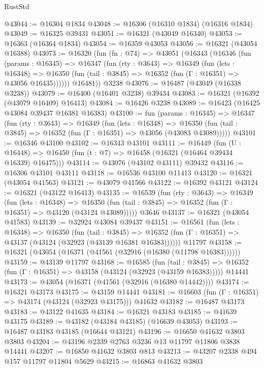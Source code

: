 \begin{lexlean}{RustStd}
\begin{coremodule}
@43044 := @16304 @1834
@43048 := @16306 (@16310 @1834) (@16316 @1834)
@43049 := @16325 @39431
@43051 := @16321 (@43049 @16340)
@43053 := @16363 (@16364 @1834)
@43054 := @16359 @43053
@43056 := @16321 (@43054 @16388)
@43073 := @16320
    (fun (fn : @74) =>
    @43051
      (@16343
        (@16346
          (fun (params : @16345) =>
          @16347
            (fun (rty : @3643) =>
            @16349
              (fun (lets : @16348) =>
              @16350 (fun (tail : @3845) => @16352 (fun (Γ : @16351) => @43056 @16435))))))
        @16481))
    @3238
@43076 := @16487 (@43049 (@16338 @3238))
@43079 := @16400 (@16401 @3238) @39434
@43083 := @16321 (@16392 (@43079 @16409) @16413)
@43084 := @16426 @3238
@43089 := @16423 (@16425 @43084 @39437 @16381 @16383)
@43100 := fun (params : @16345) =>
  @16347
    (fun (rty : @3643) =>
    @16349
      (fun (lets : @16348) =>
      @16350 (fun (tail : @3845) => @16352 (fun (Γ : @16351) => @43056 (@43083 @43089)))))
@43101 := @16346 @43100
@43102 := @16343 @43101
@43111 := @16449
    (fun (U : @16448) => @16450 (fun (t : @7) => @16458 (@16321 (@16464 @39434 @16339) @16475)))
@43114 := @43076 (@43102 @43111) @39432
@43116 := @16306 @43101 @43111
@43118 := @16536 @43100 @11413
@43120 := @16321 (@43054 @41563)
@43121 := @43079 @41566
@43122 := @16392 @43121
@43124 := @16321 (@43122 @16413)
@43135 := @16539
    (fun (rty : @3643) =>
    @16349
      (fun (lets : @16348) =>
      @16350 (fun (tail : @3845) => @16352 (fun (Γ : @16351) => @43120 (@43124 @43089)))))
    @3646
@43137 := @16321 (@43054 @41583)
@43139 := @32924 @43084 @39437
@43151 := @16561
    (fun (lets : @16348) =>
    @16350
      (fun (tail : @3845) =>
      @16352 (fun (Γ : @16351) => @43137 (@43124 (@32923 (@43139 @16381 @16383))))))
    @11797
@43158 := @16321 (@43054 (@16371 (@41561 (@32916 (@16380 (@11798 @16383))))))
@43159 := @43139 @11797
@43168 := @16585
    (fun (tail : @3845) => @16352 (fun (Γ : @16351) => @43158 (@43124 (@32923 (@43159 @16383)))))
    @14441
@43173 := @43054 (@16371 (@41561 (@32916 (@16380 @14442))))
@43174 := @16321 @43173
@43175 := @43159 @14441
@43181 := @16603 (fun (Γ : @16351) => @43174 (@43124 (@32923 @43175))) @41632
@43182 := @16487 @43173
@43183 := @43122 @41635
@43184 := @16321 @43183
@43185 := @41639 @43175
@43189 := @43182 (@43184 @43185) (@16639 @43053)
@43193 := @16487 @43183 @43185 (@16644 @43121)
@43196 := @16650 @41632 @3803 @3803
@43204 := @43196 @2339 @2763 @3236 @13 @11797 @11806 @3838 @14441
@43207 := @16850 @41632 @3803 @813
@43213 := @43207 @2338 @494 @157 @11797 @11804 @5629
@43215 := @16863 @41632 @3803

\end{coremodule}
\end{lexlean}
